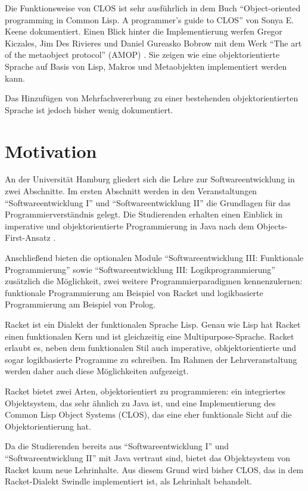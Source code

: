 Die Funktionsweise von CLOS ist sehr ausführlich in dem Buch ``Object-oriented programming in Common Lisp. A programmer's guide to CLOS'' von Sonya E. Keene \cite{keene} dokumentiert. Einen Blick hinter die Implementierung werfen Gregor Kiczales, Jim Des Rivieres und Daniel Gureasko Bobrow mit dem Werk ``The art of the metaobject protocol'' (AMOP) \cite{amop}. Sie zeigen wie eine objektorientierte Sprache auf Basis von Lisp, Makros und Metaobjekten implementiert werden kann. 

Das Hinzufügen von Mehrfachvererbung zu einer bestehenden objektorientierten Sprache ist jedoch bisher wenig dokumentiert. 

\section{Motivation} 
An der Universität Hamburg gliedert sich die Lehre zur Softwareentwicklung in zwei Abschnitte. Im ersten Abschnitt werden in den Veranstaltungen ``Softwareentwicklung I'' und ``Softwareentwicklung II'' die Grundlagen für das Programmierverständnis gelegt. Die Studierenden erhalten einen  Einblick in imperative und objektorientierte Programmierung in Java nach dem Objects-First-Ansatz \cite{objectsfirst}.

Anschließend bieten die optionalen Module ``Softwareentwicklung III: Funktionale Programmierung'' sowie ``Softwareentwicklung III: Logikprogrammierung'' zusätzlich die Möglichkeit, zwei weitere  Programmierparadigmen kennenzulernen: funktionale Programmierung am Beispiel von Racket und logikbasierte Programmierung am Beispiel von Prolog.

Racket ist ein Dialekt der funktionalen Sprache Lisp. Genau wie Lisp hat Racket einen funktionalen Kern und ist gleichzeitig eine Mul\-ti\-pur\-pose-Spra\-che. Racket erlaubt es, neben dem funktionalen Stil auch imperative, obkjektorientierte und sogar logikbasierte Programme zu schreiben. Im Rahmen der Lehrveranstaltung werden daher auch diese Möglichkeiten aufgezeigt. 

Racket bietet zwei Arten, objektorientiert zu programmieren: ein integriertes Objektsystem, das sehr ähnlich zu Java ist, und eine Implementierung des Common Lisp Object Systems (CLOS), das eine eher funktionale Sicht auf die Objektorientierung hat. 

Da die Studierenden bereits aus ``Softwareentwicklung I'' und ``Softwareentwicklung II'' mit Java vertraut sind, bietet das Objektsystem von Racket kaum neue Lehrinhalte. Aus diesem Grund wird bisher CLOS, das in dem Racket-Dialekt Swindle implementiert ist, als Lehrinhalt behandelt. 

